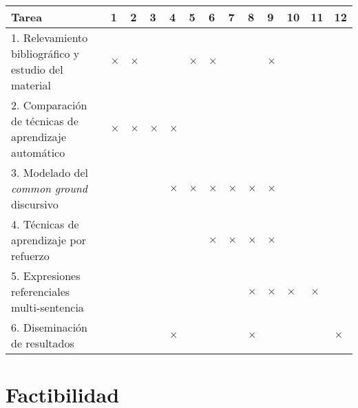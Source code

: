 \documentclass[10.9pt,a4paper]{article}
\begin{document}
{\footnotesize
\begin{center}
\begin{tabular}{|p{7cm}||p{2mm}|p{2mm}|p{2mm}|p{2mm}||p{2mm}|p{2mm}|p{2mm}|p{2mm
}||p{2mm}|p{2mm}|p{2mm}|p{2mm}||}
\hline
 \rowcolor[rgb]{0.8,0.8,0.8}\hspace{3.5cm}Tarea 
& 1 & 2 & 3 & 4 & 5 & 6 & 7 & 8 & 9 & 10 & 11 & 12\\

\hline 1. Relevamiento bibliogr\'afico y estudio del material 
& $\times$ & $\times$ &&& $\times$ & $\times$ &&& $\times$ &&&\\

\hline 2. Comparaci\'on de t\'ecnicas de aprendizaje autom\'atico
&$\times$ & $\times$ & $\times$ & $\times$ &&&&&&&&\\

\hline 3. Modelado del \emph{common ground} discursivo
&&&& $\times$ & $\times$ & $\times$ & $\times$ & $\times$ & $\times$ &&&\\

\hline 4. T\'ecnicas de aprendizaje por refuerzo
&&&&&& $\times$ & $\times$ & $\times$ & $\times$ &&&\\

\hline 5. Expresiones referenciales multi-sentencia
&&&&&&&& $\times$ & $\times$ & $\times$ & $\times$ &\\

\hline 6. Diseminaci\'on de resultados
&&&& $\times$ &&&& $\times$ &&&& $\times$\\

\hline
\end{tabular}\end{center}
}



\section{Factibilidad}
\end{document}

